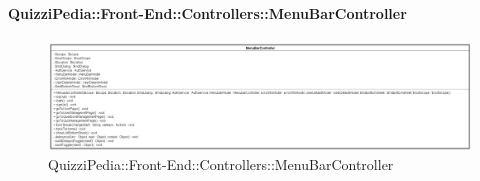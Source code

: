 \paragraph{QuizziPedia::Front-End::Controllers::MenuBarController}
\begin{figure} [ht]
	\centering
	\includegraphics[scale=0.25]{UML/Classi/Front-End/QuizziPedia_Front-end_Controller_MenuBarController.png}
	\caption{QuizziPedia::Front-End::Controllers::MenuBarController}
\end{figure} \FloatBarrier
